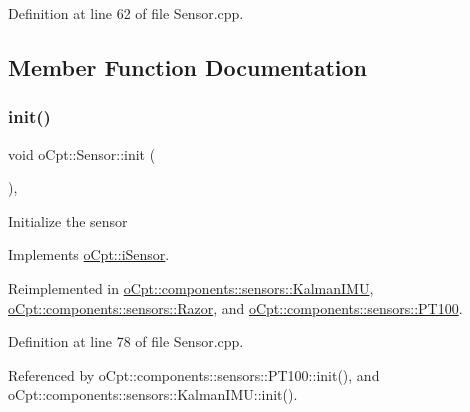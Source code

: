 Definition at line 62 of file Sensor.\+cpp.



\subsection{Member Function Documentation}
\hypertarget{classo_cpt_1_1_sensor_aa612a305a9a3091dd62cd1afb9d4dd7d}{}\label{classo_cpt_1_1_sensor_aa612a305a9a3091dd62cd1afb9d4dd7d} 
\subsubsection{\texorpdfstring{init()}{init()}}
{\footnotesize\ttfamily void o\+Cpt\+::\+Sensor\+::init (\begin{DoxyParamCaption}{ }\end{DoxyParamCaption})\hspace{0.3cm}{\ttfamily [override]}, {\ttfamily [virtual]}}

Initialize the sensor 

Implements \hyperlink{classo_cpt_1_1i_sensor_aa8def4a41b8280f7e4e02285cd7bd734}{o\+Cpt\+::i\+Sensor}.



Reimplemented in \hyperlink{classo_cpt_1_1components_1_1sensors_1_1_kalman_i_m_u_a0d2dfbc9cc468e32f9c58f0a8c92c3ca}{o\+Cpt\+::components\+::sensors\+::\+Kalman\+I\+MU}, \hyperlink{classo_cpt_1_1components_1_1sensors_1_1_razor_a1dd2b5a9fbac3c9510e2d3771abf358b}{o\+Cpt\+::components\+::sensors\+::\+Razor}, and \hyperlink{classo_cpt_1_1components_1_1sensors_1_1_p_t100_a296d0c3c2a55df465e127462c8c30215}{o\+Cpt\+::components\+::sensors\+::\+P\+T100}.



Definition at line 78 of file Sensor.\+cpp.



Referenced by o\+Cpt\+::components\+::sensors\+::\+P\+T100\+::init(), and o\+Cpt\+::components\+::sensors\+::\+Kalman\+I\+M\+U\+::init().

